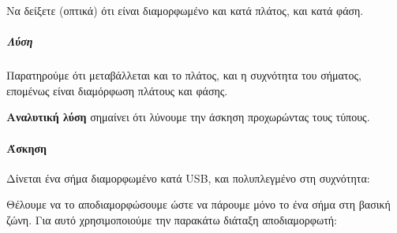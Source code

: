 \documentclass[11pt,a4paper,notitlepage,fleqn]{article}
\begin{document}
Να δείξετε (οπτικά) ότι είναι διαμορφωμένο και κατά πλάτος, και κατά φάση.
\subparagraph{Λύση}
Παρατηρούμε ότι μεταβάλλεται και το πλάτος, και η συχνότητα του σήματος, επομένως
είναι διαμόρφωση πλάτους και φάσης.

\begin{attnbox}{}
	\textbf{Αναλυτική λύση} σημαίνει ότι λύνουμε την άσκηση προχωρώντας τους τύπους.
\end{attnbox}

\paragraph{Άσκηση}
Δίνεται ένα σήμα διαμορφωμένο κατά USB, και πολυπλεγμένο στη συχνότητα:


Θέλουμε να το αποδιαμορφώσουμε ώστε να πάρουμε μόνο το ένα σήμα στη βασική ζώνη. Για αυτό
χρησιμοποιούμε την παρακάτω διάταξη αποδιαμορφωτή:
\end{document}

